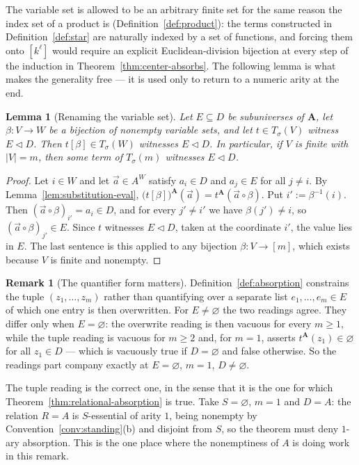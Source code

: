 \documentclass[11pt]{article}
\theoremstyle{mainplain}
\newtheorem{lemma}[theorem]{Lemma}
\theoremstyle{mainroman}
\theoremstyle{definition}
\newtheorem{remark}[theorem]{Remark}
\numberwithin{equation}{section}
\newcommand{\bA}{\mathbf A}
\newcommand{\ab}{\lhd}
\newcommand{\Tm}{T_\sigma}
\begin{document}
The variable set is allowed to be an arbitrary finite set for the same reason
the index set of a product is (Definition~\ref{def:product}): the terms
constructed in Definition~\ref{def:star} are naturally indexed by a set of
functions, and forcing them onto $[k^{\ell}]$ would require an explicit
Euclidean-division bijection at every step of the induction in
Theorem~\ref{thm:center-absorbs}. The following lemma is what makes the
generality free --- it is used only to return to a numeric arity at the end.

\begin{lemma}[Renaming the variable set]\label{lem:absorption-rename}
Let $E\subseteq D$ be subuniverses of $\bA$, let $\beta:V\to W$ be a bijection
of nonempty variable sets, and let $t\in\Tm(V)$ witness $E\ab D$. Then
$t[\beta]\in\Tm(W)$ witnesses $E\ab D$. In particular, if $V$ is finite with
$|V|=m$, then some term of $\Tm(m)$ witnesses $E\ab D$.
\end{lemma}
\begin{proof}
Let $i\in W$ and let $\vec a\in A^{W}$ satisfy $a_i\in D$ and $a_j\in E$ for
all $j\ne i$. By Lemma~\ref{lem:substitution-eval},
$\bigl(t[\beta]\bigr)^{\bA}(\vec a)=t^{\bA}(\vec a\circ\beta)$. Put
$i':=\beta^{-1}(i)$. Then $(\vec a\circ\beta)_{i'}=a_i\in D$, and for every
$j'\ne i'$ we have $\beta(j')\ne i$, so $(\vec a\circ\beta)_{j'}\in E$. Since
$t$ witnesses $E\ab D$, taken at the coordinate $i'$, the value lies in $E$.
The last sentence is this applied to any bijection $\beta:V\to[m]$, which
exists because $V$ is finite and nonempty.
\end{proof}

\begin{remark}[The quantifier form matters]\label{rem:absorption-quantifier}
Definition~\ref{def:absorption} constrains the tuple $(z_1,\dots,z_m)$ rather
than quantifying over a separate list $e_1,\dots,e_m\in E$ of which one entry is
then overwritten. For $E\ne\varnothing$ the two readings agree. They differ
only when $E=\varnothing$: the overwrite reading is then vacuous for every
$m\ge1$, while the tuple reading is vacuous for $m\ge2$ and, for $m=1$, asserts
$t^{\bA}(z_1)\in\varnothing$ for all $z_1\in D$ --- which is vacuously true if
$D=\varnothing$ and false otherwise. So the readings part company exactly at
$E=\varnothing$, $m=1$, $D\ne\varnothing$.

The tuple reading is the correct one, in the sense that it is the one for which
Theorem~\ref{thm:relational-absorption} is true. Take $S=\varnothing$, $m=1$
and $D=A$: the relation $R=A$ is $S$-essential of arity $1$, being nonempty by
Convention~\ref{conv:standing}(b) and disjoint from $S$, so the theorem must
deny $1$-ary absorption. This is the one place where the nonemptiness of $A$ is
doing work in this remark.
\end{remark}
\end{document}
